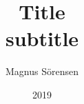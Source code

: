 \documentclass{beamer}
\title{Title\\subtitle}
\author{Magnus Sörensen}
\institute{Märlardalens högskola}
\date{2019}
\begin{document}
\frame{\titlepage}



\end{document}
